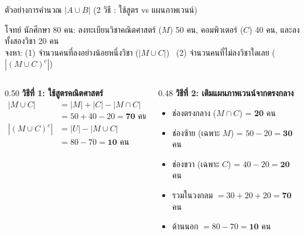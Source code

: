 \begin{frame}{ตัวอย่างการคำนวณ $|A \cup B|$ (2 วิธี : ใช้สูตร vs แผนภาพเวนน์)}
  \begin{block}{โจทย์}
    นักศึกษา 80 คน: ลงทะเบียนวิชาคณิตศาสตร์ ($M$) 50 คน, คอมพิวเตอร์ ($C$) 40 คน, และลงทั้งสองวิชา 20 คน \\
    จงหา: (1) จำนวนคนที่ลงอย่างน้อยหนึ่งวิชา ($|M \cup C|$) \ (2) จำนวนคนที่ไม่ลงวิชาใดเลย ($|(M \cup C)^c|$)
  \end{block}
  \pause
  \begin{columns}[T]
    \begin{column}{0.50\textwidth}
      \textbf{วิธีที่ 1: ใช้สูตรคณิตศาสตร์}
      \begin{align*}
        |M \cup C| &= |M| + |C| - |M \cap C| \\
                   &= 50 + 40 - 20 = \mathbf{70} \text{ คน} \\[0.3em]
        |(M \cup C)^c| &= |U| - |M \cup C| \\
                       &= 80 - 70 = \mathbf{10} \text{ คน}
      \end{align*}
    \end{column}
    \begin{column}{0.48\textwidth}
      \textbf{วิธีที่ 2: เติมแผนภาพเวนน์จากตรงกลาง}
      \begin{itemize}\small
        \item ช่องตรงกลาง ($M \cap C$) = \textbf{20} คน
        \item ช่องซ้าย (เฉพาะ $M$) = $50 - 20 = \mathbf{30}$ คน
        \item ช่องขวา (เฉพาะ $C$) = $40 - 20 = \mathbf{20}$ คน
        \item รวมในวงกลม $= 30 + 20 + 20 = \mathbf{70}$ คน
        \item ด้านนอก $= 80 - 70 = \mathbf{10}$ คน
      \end{itemize}
    \end{column}
  \end{columns}
\end{frame}

